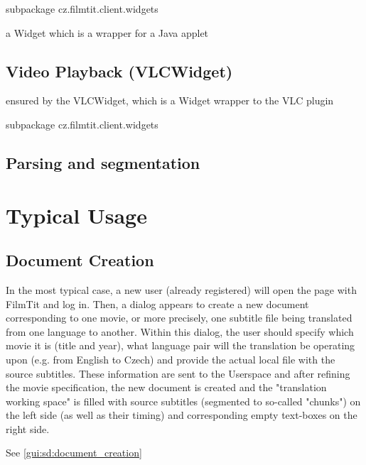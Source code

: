 subpackage cz.filmtit.client.widgets

a Widget which is a wrapper for a Java applet


\subsection{Video Playback (VLCWidget)}

ensured by the VLCWidget, which is a Widget wrapper to the VLC plugin

subpackage cz.filmtit.client.widgets


\subsection{Parsing and segmentation}

\section{Typical Usage}


\subsection{Document Creation}

In the most typical case, a new user (already registered) will open the page with FilmTit and log in. Then, a dialog appears to create a new document corresponding to one movie, or more precisely, one subtitle file being translated from one language to another. Within this dialog, the user should specify which movie it is (title and year), what language pair will the translation be operating upon (e.g. from English to Czech) and provide the actual local file with the source subtitles. These information are sent to the Userspace and after refining the movie specification, the new document is created and the "translation working space" is filled with source subtitles (segmented to so-called "chunks") on the left side (as well as their timing) and corresponding empty text-boxes on the right side.

See \ref{gui:sd:document_creation}

